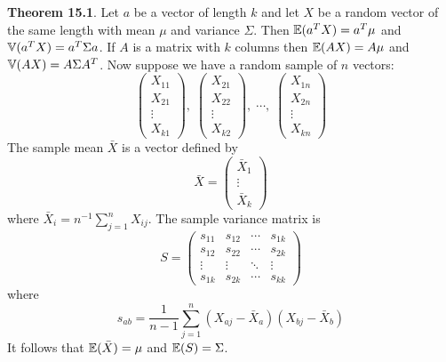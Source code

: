 \textbf{Theorem 15.1}. Let \(a\) be a vector of length \(k\) and let
\(X\) be a random vector of the same length with mean \(\mu\) and
variance \(\Sigma\). Then \(\operatorname{\mathbb{E}}(a^T X) = a^T\mu\) and
\(\operatorname{\mathbb{V}}(a^T X) = a^T \Sigma a\). If \(A\) is a matrix with \(k\)
columns then \(\operatorname{\mathbb{E}}(AX) = A\mu\) and
\(\operatorname{\mathbb{V}}(AX) = A \Sigma A^T\).
Now suppose we have a random sample of \(n\) vectors:
\[
\begin{pmatrix}X_{11} \\ X_{21} \\ \vdots \\ X_{k1} \end{pmatrix}, \;
\begin{pmatrix}X_{21} \\ X_{22} \\ \vdots \\ X_{k2} \end{pmatrix}, \;
\cdots , \;
\begin{pmatrix}X_{1n} \\ X_{2n} \\ \vdots \\ X_{kn} \end{pmatrix}
\]
The sample mean \(\bar{X}\) is a vector defined by
\[
\bar{X} = \begin{pmatrix} \bar{X}_{1} \\ \vdots \\ \bar{X}_{k} \end{pmatrix}
\]
where \(\bar{X}_{i} = n^{-1} \sum_{j = 1}^{n} X_{ij}\). The sample
variance matrix is
\[
S = \begin{pmatrix} 
s_{11} & s_{12} & \cdots & s_{1k} \\
s_{12} & s_{22} & \cdots & s_{2k} \\
\vdots & \vdots & \ddots & \vdots \\
s_{1k} & s_{2k} & \cdots & s_{kk}
\end{pmatrix}
\]
where
\[
s_{ab} = \frac{1}{n - 1} \sum_{j = 1}^{n} (X_{aj} - \bar{X}_a) (X_{bj} - \bar{X}_b)
\]
It follows that \(\operatorname{\mathbb{E}}(\bar{X}) = \mu\) and
\(\operatorname{\mathbb{E}}(S) = \Sigma\).

